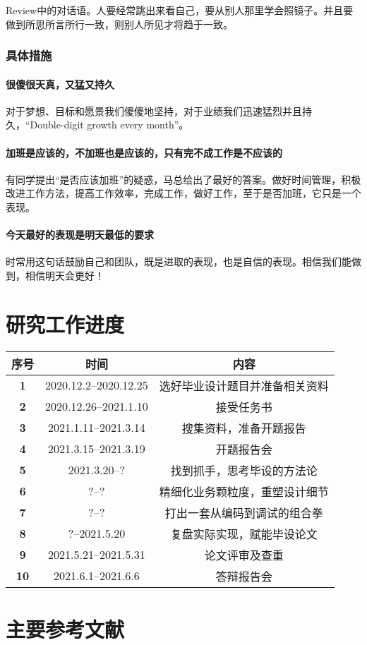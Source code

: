 \documentclass{HDU-Bachelor-Thesis-Proposal}
\begin{document}
Review中的对话语。人要经常跳出来看自己，要从别人那里学会照镜子。并且要做到所思所言所行一致，则别人所见才将趋于一致。

\subsubsection{具体措施}

\paragraph{很傻很天真，又猛又持久}

对于梦想、目标和愿景我们傻傻地坚持，对于业绩我们迅速猛烈并且持久，“Double-digit growth every month”。

\paragraph{加班是应该的，不加班也是应该的，只有完不成工作是不应该的}

有同学提出“是否应该加班”的疑惑，马总给出了最好的答案。做好时间管理，积极改进工作方法，提高工作效率，完成工作，做好工作，至于是否加班，它只是一个表现。

\paragraph{今天最好的表现是明天最低的要求}

时常用这句话鼓励自己和团队，既是进取的表现，也是自信的表现。相信我们能做到，相信明天会更好！



\clearpage
\section{研究工作进度}

\begin{table}[h]%
	\centering
	\begin{tabular}{| c | c | c |}%
    \hline
	\bfseries 序号 & \bfseries 时间 & \bfseries 内容 \\ \hline
	\bfseries 1 & 2020.12.2--2020.12.25 & 选好毕业设计题目并准备相关资料 \\ \hline
	\bfseries 2 & 2020.12.26--2021.1.10 & 接受任务书 \\ \hline
    \bfseries 3 & 2021.1.11--2021.3.14 & 搜集资料，准备开题报告 \\ \hline
	\bfseries 4 & 2021.3.15--2021.3.19 & 开题报告会 \\ \hline
    \bfseries 5 & 2021.3.20--? & 找到抓手，思考毕设的方法论 \\ \hline
	\bfseries 6 & ?--? & 精细化业务颗粒度，重塑设计细节 \\ \hline
    \bfseries 7 & ?--? & 打出一套从编码到调试的组合拳 \\ \hline
	\bfseries 8 & ?--2021.5.20 & 复盘实际实现，赋能毕设论文 \\ \hline
    \bfseries 9 & 2021.5.21--2021.5.31 & 论文评审及查重 \\ \hline
	\bfseries 10 & 2021.6.1--2021.6.6 & 答辩报告会 \\ \hline
    \end{tabular}
\end{table}

\section{主要参考文献}
\printbibliography[heading=none]

\makeassessment
\end{document}
